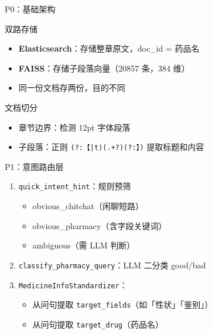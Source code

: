 \documentclass[aspectratio=169,11pt]{beamer}
\begin{document}
\begin{frame}{P0：基础架构}
    \begin{block}{双路存储}
        \begin{itemize}
            \item \textbf{Elasticsearch}：存储整章原文，doc\_id = 药品名
            \item \textbf{FAISS}：存储子段落向量（20857 条，384 维）
            \item 同一份文档存两份，目的不同
        \end{itemize}
    \end{block}
    \begin{block}{文档切分}
        \begin{itemize}
            \item 章节边界：检测 12pt 字体段落
            \item 子段落：正则 \texttt{(?:【|t)(.+?)(?:】)} 提取标题和内容
        \end{itemize}
    \end{block}
\end{frame}

\begin{frame}{P1：意图路由层}
    \begin{enumerate}
        \item \texttt{quick\_intent\_hint}：规则预筛
        \begin{itemize}
            \item obvious\_chitchat（闲聊短路）
            \item obvious\_pharmacy（含字段关键词）
            \item ambiguous（需 LLM 判断）
        \end{itemize}
        \item \texttt{classify\_pharmacy\_query}：LLM 二分类 good/bad
        \item \texttt{MedicineInfoStandardizer}：
        \begin{itemize}
            \item 从问句提取 \texttt{target\_fields}（如「性状」「鉴别」）
            \item 从问句提取 \texttt{target\_drug}（药品名）
        \end{itemize}
    \end{enumerate}
\end{frame}
\end{document}
